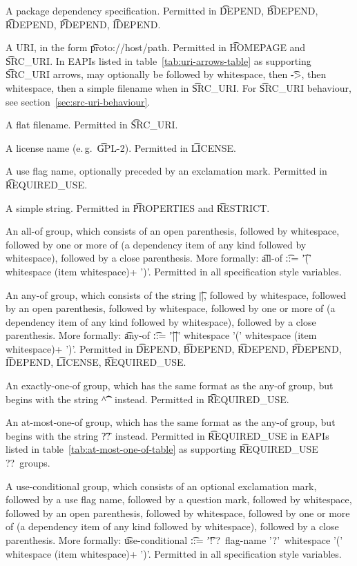 \begin{compactitem}
\item A package dependency specification. Permitted in \t{DEPEND}, \t{BDEPEND}, \t{RDEPEND},
    \t{PDEPEND}, \t{IDEPEND}.
\item A URI, in the form \t{proto://host/path}. Permitted in \t{HOMEPAGE} and \t{SRC_URI}\@.
    In EAPIs listed in table~\ref{tab:uri-arrows-table} as supporting \t{SRC_URI} arrows, may
    optionally be followed by whitespace, then \t{->}, then whitespace, then a simple filename when
    in \t{SRC_URI}\@. For \t{SRC_URI} behaviour, see section~\ref{sec:src-uri-behaviour}.
\item A flat filename. Permitted in \t{SRC_URI}.
\item A license name (e.\,g.\ \t{GPL-2}). Permitted in \t{LICENSE}.
\item A use flag name, optionally preceded by an exclamation mark. Permitted in \t{REQUIRED_USE}.
\item A simple string. Permitted in \t{PROPERTIES} and \t{RESTRICT}.
\item An all-of group, which consists of an open parenthesis, followed by whitespace,
    followed by one or more of (a dependency item of any kind followed by whitespace), followed
    by a close parenthesis. More formally:
    \t{all-of} \t{::=} \t{'(' whitespace (item whitespace)+ ')'}. Permitted in all specification
    style variables.
\item An any-of group, which consists of the string \t{||}, followed by whitespace,
    followed by an open parenthesis, followed by whitespace, followed by one or more
    of (a dependency item of any kind followed by whitespace), followed by a close parenthesis.
    More formally: \t{any-of} \t{::=} \t{'||' whitespace '(' whitespace (item whitespace)+ ')'}.
    Permitted in \t{DEPEND}, \t{BDEPEND}, \t{RDEPEND}, \t{PDEPEND}, \t{IDEPEND}, \t{LICENSE},
    \t{REQUIRED_USE}.
\item An exactly-one-of group, which has the same format as the any-of group, but begins with the
    string \t{\textasciicircum\textasciicircum} instead. Permitted in \t{REQUIRED_USE}.
\item {} An at-most-one-of group, which has the same format as the
    any-of group, but begins with the string \t{??}\ instead. Permitted in \t{REQUIRED_USE} in
    EAPIs listed in table~\ref{tab:at-most-one-of-table} as supporting \t{REQUIRED_USE ??}\ groups.
\item A use-conditional group, which consists of an optional exclamation mark, followed by
    a use flag name, followed by a question mark, followed by whitespace, followed by
    an open parenthesis, followed by whitespace, followed by one or more of (a dependency item
    of any kind followed by whitespace), followed by a close parenthesis. More formally:
    \t{use-conditional} \t{::=} \t{'!'?\ flag-name '?'\ whitespace '(' whitespace (item
    whitespace)+ ')'}.
    Permitted in all specification style variables.
\end{compactitem}


